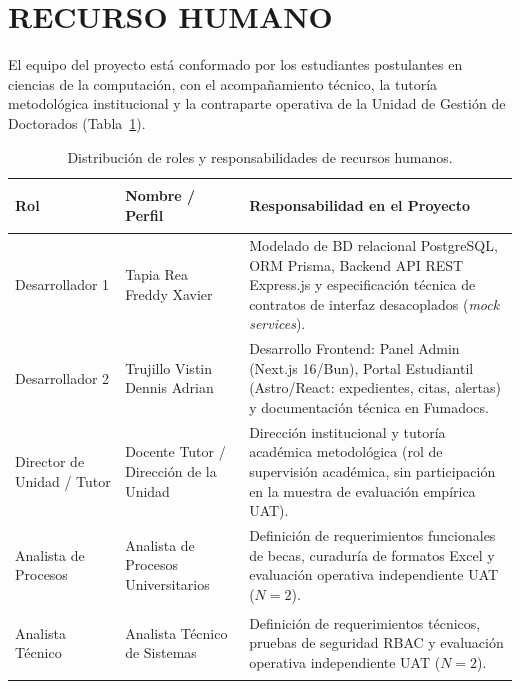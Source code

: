 
\section{RECURSO HUMANO}

El equipo del proyecto está conformado por los estudiantes postulantes en ciencias de la computación, con el acompañamiento técnico, la tutoría metodológica institucional y la contraparte operativa de la Unidad de Gestión de Doctorados (Tabla~\ref{tab:recurso_humano}).

\begin{table}[H]
    \centering
    \small
    \caption{Distribución de roles y responsabilidades de recursos humanos.}
    \label{tab:recurso_humano}
    \begin{tabularx}{\linewidth}{>{\bfseries\raggedright\arraybackslash}p{2.8cm} >{\raggedright\arraybackslash}p{3.2cm} >{\raggedright\arraybackslash}X}
        \toprule
        \rowcolor{TableHeadBg}
        \color{white}\textbf{Rol} & 
        \color{white}\textbf{Nombre / Perfil} & 
        \color{white}\textbf{Responsabilidad en el Proyecto} \\
        \midrule
        Desarrollador 1 & Tapia Rea Freddy Xavier & Modelado de BD relacional PostgreSQL, ORM Prisma, Backend API REST Express.js y especificación técnica de contratos de interfaz desacoplados (\textit{mock services}). \\
        \rowcolor{TableAltRow}
        Desarrollador 2 & Trujillo Vistin Dennis Adrian & Desarrollo Frontend: Panel Admin (Next.js 16/Bun), Portal Estudiantil (Astro/React: expedientes, citas, alertas) y documentación técnica en Fumadocs. \\
        Director de Unidad / Tutor & Docente Tutor / Dirección de la Unidad & Dirección institucional y tutoría académica metodológica (rol de supervisión académica, sin participación en la muestra de evaluación empírica UAT). \\
        \rowcolor{TableAltRow}
        Analista de Procesos & Analista de Procesos Universitarios & Definición de requerimientos funcionales de becas, curaduría de formatos Excel y evaluación operativa independiente UAT ($N = 2$). \\
        Analista Técnico & Analista Técnico de Sistemas & Definición de requerimientos técnicos, pruebas de seguridad RBAC y evaluación operativa independiente UAT ($N = 2$). \\
        \bottomrule
    \end{tabularx}
\end{table}

